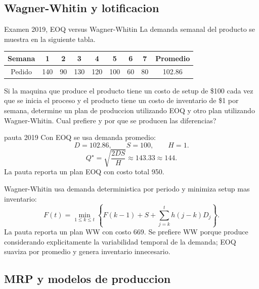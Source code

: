\subsection{Wagner-Whitin y lotificacion}

\begin{enunciado}{Examen 2019, EOQ versus Wagner-Whitin}
La demanda semanal del producto se muestra en la siguiente tabla.

\begin{center}
\begin{tabular}{c|ccccccc|c}
\toprule
Semana & 1 & 2 & 3 & 4 & 5 & 6 & 7 & Promedio\\
\midrule
Pedido & 140 & 90 & 130 & 120 & 100 & 60 & 80 & 102.86\\
\bottomrule
\end{tabular}
\end{center}

Si la maquina que produce el producto tiene un costo de setup de \$100 cada vez que se inicia el proceso y el producto tiene un costo de inventario de \$1 por semana, determine un plan de produccion utilizando EOQ y otro plan utilizando Wagner-Whitin. Cual prefiere y por que se producen las diferencias?
\end{enunciado}

\begin{pautacompleta}{pauta 2019}
Con EOQ se usa demanda promedio:
\[
  D=102.86,\qquad S=100,\qquad H=1.
\]
\[
  Q^\star=\sqrt{\frac{2DS}{H}}\approx 143.33\approx 144.
\]
La pauta reporta un plan EOQ con costo total 950.

Wagner-Whitin usa demanda deterministica por periodo y minimiza setup mas inventario:
\[
  F(t)=\min_{1\le k\le t}\left\{F(k-1)+S+\sum_{j=k}^{t}h(j-k)D_j\right\}.
\]
La pauta reporta un plan WW con costo 669. Se prefiere WW porque produce considerando explicitamente la variabilidad temporal de la demanda; EOQ suaviza por promedio y genera inventario innecesario.
\end{pautacompleta}

\subsection{MRP y modelos de produccion}

